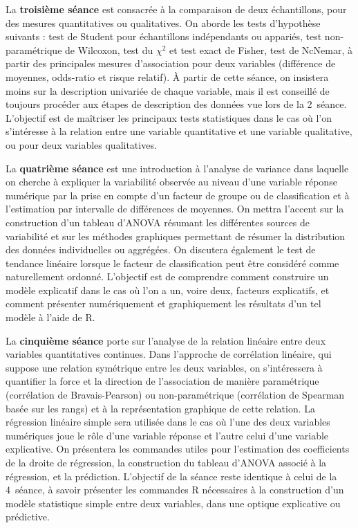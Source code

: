 \documentclass[11pt]{report}
\theoremstyle{definition}
\newcommand{\R}{\textsf{R}\xspace}
\begin{document}
La \textbf{troisième séance} est consacrée à la comparaison de deux
échantillons, pour des mesures quantitatives ou qualitatives. On aborde les
tests d'hypothèse suivants : test de Student pour échantillons indépendants
ou appariés, test non-paramétrique de Wilcoxon, test du $\chi^2$ et test
exact de Fisher, test de NcNemar, à partir des principales mesures
d'association pour deux variables (différence de moyennes, odds-ratio et
risque relatif). À partir de cette séance, on insistera moins sur la
description univariée de chaque variable, mais il est conseillé de toujours
procéder aux étapes de description des données vue lors de la 2\ieme\
séance. L'objectif est de maîtriser les principaux tests statistiques dans
le cas où l'on s'intéresse à la relation entre une variable quantitative et
une variable qualitative, ou pour deux variables qualitatives.

La \textbf{quatrième séance} est une introduction à l'analyse de variance
dans laquelle on cherche à expliquer la variabilité observée au niveau d'une
variable réponse numérique par la prise en compte d'un facteur de groupe ou
de classification et à l'estimation par intervalle de différences de
moyennes. On mettra l'accent sur la construction d'un tableau d'ANOVA
résumant les différentes sources de variabilité et sur les méthodes
graphiques permettant de résumer la distribution des données individuelles
ou aggrégées. On discutera également le test de tendance linéaire lorsque le
facteur de classification peut être considéré comme naturellement
ordonné. L'objectif est de comprendre comment construire un modèle
explicatif dans le cas où l'on a un, voire deux, facteurs explicatifs, et
comment présenter numériquement et graphiquement les résultats d'un tel
modèle à l'aide de \R.

La \textbf{cinquième séance} porte sur l'analyse de la relation linéaire
entre deux variables quantitatives continues. Dans l'approche de corrélation
linéaire, qui suppose une relation symétrique entre les deux variables, on
s'intéressera à quantifier la force et la direction de l'association de
manière paramétrique (corrélation de Bravais-Pearson) ou non-paramétrique
(corrélation de Spearman basée sur les rangs) et à la représentation
graphique de cette relation. La régression linéaire simple sera utilisée
dans le cas où l'une des deux variables numériques joue le rôle d'une
variable réponse et l'autre celui d'une variable explicative. On présentera
les commandes utiles pour l'estimation des coefficients de la droite de
régression, la construction du tableau d'ANOVA associé à la régression, et
la prédiction. L'objectif de la séance reste identique à celui de la 4\ieme\
séance, à savoir présenter les commandes \R nécessaires à la construction
d'un modèle statistique simple entre deux variables, dans une optique
explicative ou prédictive.
\end{document}
